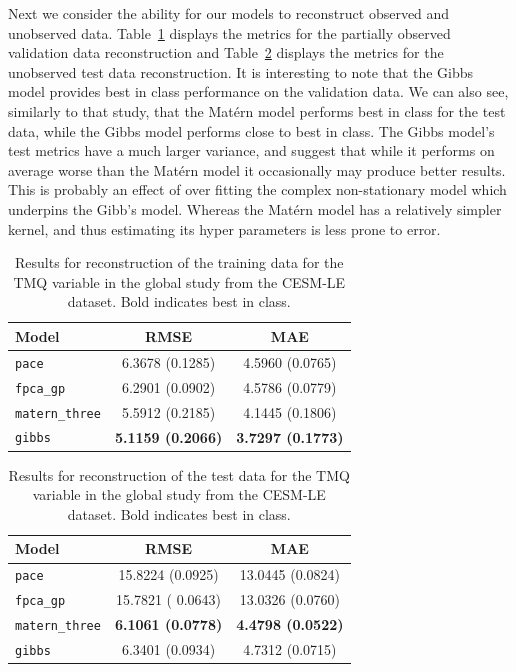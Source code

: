 Next we consider the ability for our models to reconstruct observed and unobserved data. 
Table~\ref{tab:train_cesm_tmq_globe} displays the metrics for the partially observed validation data reconstruction and Table~\ref{tab:test_cesm_tmq_globe} displays the metrics for the unobserved test data reconstruction.
It is interesting to note that the Gibbs model provides best in class performance on the  validation data.
We can also see, similarly to that study, that the Mat\'ern model performs best in class for the test data, while the Gibbs model performs close to best in class.
The Gibbs model's test metrics have a much larger variance, and suggest that while it performs on average worse than the Mat\'ern model it occasionally may produce better results.
This is probably an effect of over fitting the complex non-stationary model which underpins the Gibb's model.
Whereas the Mat\'ern model has a relatively simpler kernel, and thus estimating its hyper parameters is less prone to error.

\begin{table}
	\caption[Results for TMQ variable on training data in the Global study]{Results for reconstruction of the training data for the TMQ variable in the global study from the CESM-LE dataset. Bold indicates best in class.}
	\centering
	\label{tab:train_cesm_tmq_globe}
	\begin{tabular}{lcc}
		\toprule
		\textbf{Model} & \textbf{RMSE} & \textbf{MAE} \\
		\midrule
		\verb*|pace| & 6.3678 (0.1285) & 4.5960 (0.0765) \\
		\verb*|fpca_gp| & 6.2901	(0.0902) & 4.5786 (0.0779) \\
		\verb*|matern_three| & 5.5912 (0.2185)& 4.1445 (0.1806)\\
		\verb*|gibbs| & \textbf{5.1159 (0.2066)} & \textbf{3.7297 (0.1773)}\\
		\bottomrule
	\end{tabular}
\end{table}

\begin{table}
	\caption[Results for TMQ variable on test data in the Global study]{Results for reconstruction of the test data for the TMQ variable in the global study from the CESM-LE dataset. Bold indicates best in class.}
	\centering
	\label{tab:test_cesm_tmq_globe}
	\begin{tabular}{lcc}
		\toprule
		\textbf{Model} & \textbf{RMSE} & \textbf{MAE} \\
		\midrule
		\verb*|pace| & 15.8224 (0.0925) & 13.0445 (0.0824) \\
		\verb*|fpca_gp| & 15.7821 (	0.0643) & 13.0326 (0.0760) \\
		\verb*|matern_three| & \textbf{6.1061 (0.0778)}& \textbf{4.4798 (0.0522)}\\
		\verb*|gibbs| & 6.3401 (0.0934) & 4.7312 (0.0715)\\
		\bottomrule
	\end{tabular}
\end{table}

